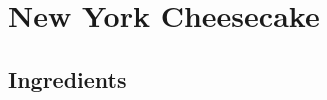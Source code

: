 \thispagestyle{fancy}
\section{New York Cheesecake}
\AddToShipoutPicture*{\Cheesecake}

\subsection*{Ingredients}